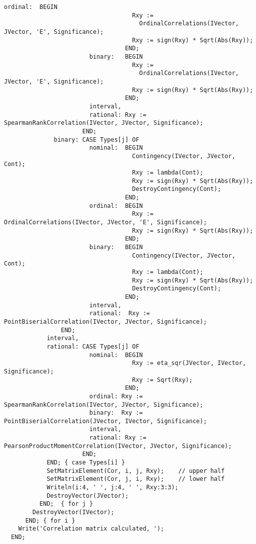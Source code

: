 \begin{lstlisting}[caption=Calculate the correlation matrix]
                        ordinal:  BEGIN
                                    Rxy :=
                                      OrdinalCorrelations(IVector, JVector, 'E', Significance);
                                    Rxy := sign(Rxy) * Sqrt(Abs(Rxy));
                                  END;
                        binary:   BEGIN
                                    Rxy :=
                                      OrdinalCorrelations(IVector, JVector, 'E', Significance);
                                    Rxy := sign(Rxy) * Sqrt(Abs(Rxy));
                                  END;
                        interval,
                        rational: Rxy := SpearmanRankCorrelation(IVector, JVector, Significance);
                      END;
              binary: CASE Types[j] OF
                        nominal:  BEGIN
                                    Contingency(IVector, JVector, Cont);
                                    Rxy := lambda(Cont);
                                    Rxy := sign(Rxy) * Sqrt(Abs(Rxy));
                                    DestroyContingency(Cont);
                                  END;
                        ordinal:  BEGIN
                                    Rxy := OrdinalCorrelations(IVector, JVector, 'E', Significance);
                                    Rxy := sign(Rxy) * Sqrt(Abs(Rxy));
                                  END;
                        binary:   BEGIN
                                    Contingency(IVector, JVector, Cont);
                                    Rxy := lambda(Cont);
                                    Rxy := sign(Rxy) * Sqrt(Abs(Rxy));
                                    DestroyContingency(Cont);
                                  END;
                        interval,
                        rational:  Rxy := PointBiserialCorrelation(IVector, JVector, Significance);
                END;
            interval,
            rational: CASE Types[j] OF
                        nominal:  BEGIN
                                    Rxy := eta_sqr(JVector, IVector, Significance);
                                    Rxy := Sqrt(Rxy);
                                  END;
                        ordinal: Rxy := SpearmanRankCorrelation(IVector, JVector, Significance);
                        binary:  Rxy := PointBiserialCorrelation(JVector, IVector, Significance);
                        interval,
                        rational: Rxy := PearsonProductMomentCorrelation(IVector, JVector, Significance);
                      END;
            END; { case Types[i] }
            SetMatrixElement(Cor, i, j, Rxy);    // upper half
            SetMatrixElement(Cor, j, i, Rxy);    // lower half
            Writeln(i:4, ' ', j:4, ' ', Rxy:3:3);
            DestroyVector(JVector);
          END;  { for j }
        DestroyVector(IVector);
      END; { for i }
    Write('Correlation matrix calculated, ');
  END;
\end{lstlisting}

